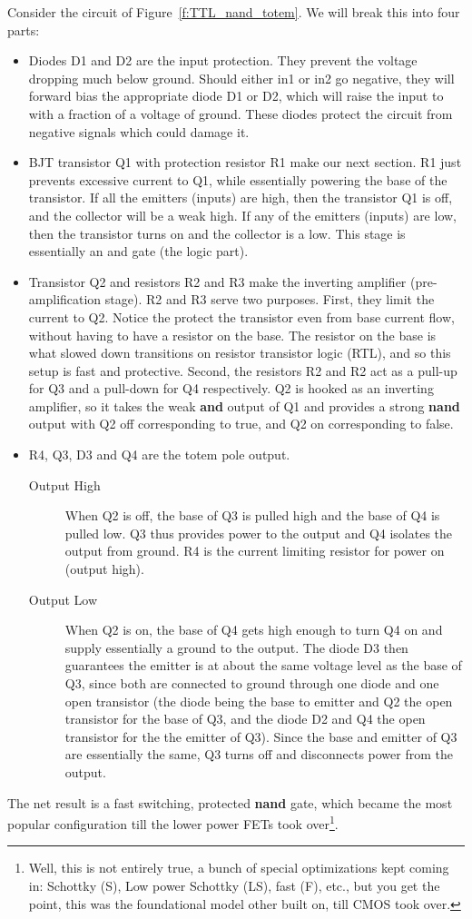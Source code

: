 Consider the circuit of Figure~\ref{f:TTL_nand_totem}.  We will break this into four parts:
\begin{itemize}
\item Diodes D1 and D2 are the input protection.  They prevent the voltage dropping much below ground.  Should either in1 or in2 go negative, they will forward bias the appropriate diode D1 or D2, which will raise the input to with a fraction of a voltage of ground.  These diodes protect the circuit from negative signals which could damage it.
\item BJT transistor Q1 with protection resistor R1 make our next section.  R1 just prevents excessive current to Q1, while essentially powering the base of the transistor.  If all the emitters (inputs) are high, then the transistor Q1 is off, and the collector will be a weak high.  If any of the emitters (inputs) are low, then the transistor turns on and the collector is a low.  This stage is essentially an and gate (the logic part).
\item Transistor Q2 and resistors R2 and R3 make the inverting amplifier (pre-amplification stage).  R2 and R3 serve two purposes.  First, they limit the current to Q2.  Notice the protect the transistor even from base current flow, without having to have a resistor on the base.  The resistor on the base is what slowed down transitions on resistor transistor logic (RTL), and so this setup is fast and protective.  Second, the resistors R2 and R2 act as a pull-up for Q3 and a pull-down for Q4 respectively.  Q2 is hooked as an inverting amplifier, so it takes the weak \textbf{and} output of Q1 and provides a strong \textbf{nand} output with Q2 off corresponding to true, and Q2 on corresponding to false.
\item R4, Q3, D3 and Q4 are the totem pole output. 
\begin{description}
\item[Output High] When Q2 is off, the base of Q3 is pulled high and the base of Q4 is pulled low. Q3 thus provides power to the output and Q4 isolates the output from ground.   R4 is  the current limiting resistor for power on (output high).  
\item[Output Low] When Q2 is on, the base of Q4 gets high enough to turn Q4 on and supply essentially a ground to the output.  The diode D3 then guarantees the emitter is at about the same voltage level as the base of Q3, since both are connected to ground through one diode and one open transistor (the diode being the base to emitter and Q2 the open transistor for the base of Q3, and the diode D2 and Q4 the open transistor for the the emitter of Q3).  Since the base and emitter of Q3 are essentially the same, Q3 turns off and disconnects power from the output.
\end{description}
\end{itemize}
The net result is a fast switching, protected \textbf{nand} gate, which became the most popular configuration till the lower power FETs took over\footnote{Well, this is not entirely true, a bunch of special optimizations kept coming in: Schottky (S), Low power Schottky (LS), fast (F), etc., but you get the point, this was the foundational model other built on, till CMOS took over.}.


